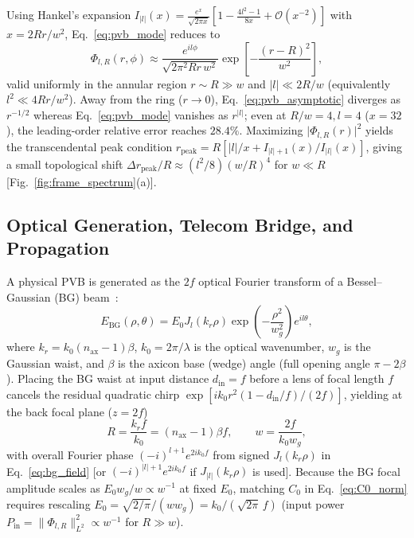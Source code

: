 \documentclass[aps,pra,onecolumn,notitlepage,11pt,tightenlines,amsmath,amssymb,floatfix,longbibliography]{revtex4-2}
\providecommand{\abs}[1]{\lvert#1\rvert}
\providecommand{\norm}[1]{\lVert#1\rVert}
\begin{document}
Using Hankel's expansion $I_{\abs{l}}(x) = \frac{e^x}{\sqrt{2\pi x}}[1 - \frac{4l^2-1}{8x} + \mathcal{O}(x^{-2})]$ with $x = 2Rr/w^2$, Eq.~\eqref{eq:pvb_mode} reduces to~\cite{Ferreira2026}
\begin{equation}
\Phi_{l,R}(r,\phi) \approx \frac{e^{il\phi}}{\sqrt{2\pi^2 R r\, w^2}} \exp\!\left[-\frac{(r - R)^2}{w^2}\right],
\label{eq:pvb_asymptotic}
\end{equation}
valid uniformly in the annular region $r \sim R \gg w$ and $\abs{l} \ll 2R/w$ (equivalently $l^2 \ll 4Rr/w^2$). Away from the ring ($r \to 0$), Eq.~\eqref{eq:pvb_asymptotic} diverges as $r^{-1/2}$ whereas Eq.~\eqref{eq:pvb_mode} vanishes as $r^{\abs{l}}$; even at $R/w = 4, l = 4$ ($x=32$), the leading-order relative error reaches $28.4\%$. Maximizing $\abs{\Phi_{l,R}(r)}^2$ yields the transcendental peak condition $r_{\mathrm{peak}} = R[\abs{l}/x + I_{\abs{l}+1}(x)/I_{\abs{l}}(x)]$, giving a small topological shift $\Delta r_{\mathrm{peak}}/R \approx (l^2/8)(w/R)^4$ for $w \ll R$ [Fig.~\ref{fig:frame_spectrum}(a)].

\subsection{Optical Generation, Telecom Bridge, and Propagation}
\label{subsec:pvb_generation}

A physical PVB is generated as the $2f$ optical Fourier transform of a Bessel--Gaussian (BG) beam~\cite{Gori1987,Vaity2015}:
\begin{equation}
E_{\mathrm{BG}}(\rho,\theta) = E_0 J_l(k_r\rho)\exp\!\left(-\frac{\rho^2}{w_g^2}\right) e^{il\theta},
\label{eq:bg_field}
\end{equation}
where $k_r = k_0(n_{\mathrm{ax}}-1)\beta$, $k_0 = 2\pi/\lambda$ is the optical wavenumber, $w_g$ is the Gaussian waist, and $\beta$ is the axicon base (wedge) angle (full opening angle $\pi - 2\beta$). Placing the BG waist at input distance $d_{\mathrm{in}} = f$ before a lens of focal length $f$ cancels the residual quadratic chirp $\exp[i k_0 r^2(1-d_{\mathrm{in}}/f)/(2f)]$, yielding at the back focal plane ($z=2f$)~\cite{Vaity2015,Villalba2023}
\begin{equation}
R = \frac{k_r f}{k_0} = (n_{\mathrm{ax}}-1)\beta f, \qquad w = \frac{2f}{k_0 w_g},
\label{eq:fourier_parameters}
\end{equation}
with overall Fourier phase $(-i)^{l+1} e^{2ik_0 f}$ from signed $J_l(k_r\rho)$ in Eq.~\eqref{eq:bg_field} [or $(-i)^{\abs{l}+1} e^{2ik_0 f}$ if $J_{\abs{l}}(k_r\rho)$ is used]. Because the BG focal amplitude scales as $E_0 w_g / w \propto w^{-1}$ at fixed $E_0$, matching $C_0$ in Eq.~\eqref{eq:C0_norm} requires rescaling $E_0 = \sqrt{2/\pi}/(w w_g) = k_0/(\sqrt{2\pi}\,f)$ (input power $P_{\mathrm{in}} = \norm{\Phi_{l,R}}_{L^2}^2 \propto w^{-1}$ for $R \gg w$).
\end{document}
